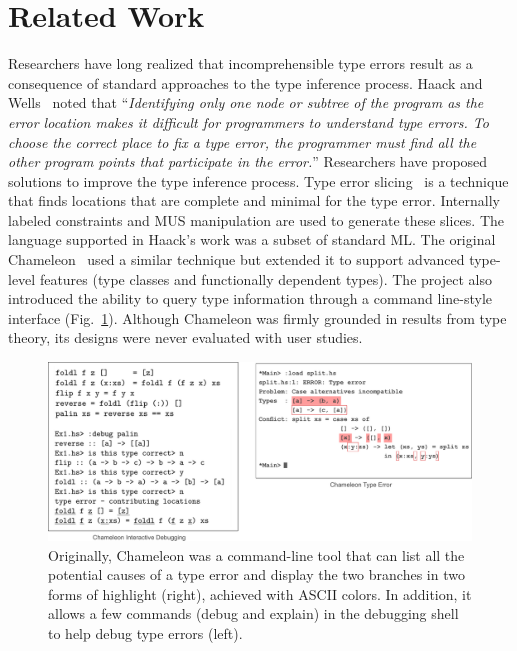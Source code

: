 \section{Related Work}

Researchers have long realized that incomprehensible type errors result as a consequence of standard approaches to the type inference process. Haack and Wells~\cite{haack2004type} noted that ``\textit{Identifying only one node or subtree of the program as the error location makes it difficult for programmers to understand type errors. To choose the correct place to fix a type error, the programmer must find all the other program points that participate in the error.}'' Researchers have proposed solutions to improve the type inference process. Type error slicing~\cite{haack2004type} is a technique that finds locations that are complete and minimal for the type error. Internally labeled constraints and MUS manipulation are used to generate these slices. The language supported in Haack's work was a subset of standard ML. The original Chameleon~\cite{stuckey2003interactive} used a similar technique but extended it to support advanced type-level features (type classes and functionally dependent types). The project also introduced the ability to query type information through a command line-style interface (Fig.~\ref{fig:original-chameleon}). Although Chameleon was firmly grounded in results from type theory, its designs were never evaluated with user studies.


\begin{figure}[h]
    \centering
    \includegraphics[width=\linewidth]{images/original-chameleon.pdf}
    \caption{
Originally, Chameleon was a command-line tool that can list all the potential causes of a type error and display the two branches in two forms of highlight (right), achieved with ASCII colors. In addition, it allows a few commands (debug and explain) in the debugging shell to help debug type errors (left).}
    \label{fig:original-chameleon}
\end{figure}


